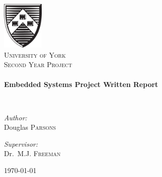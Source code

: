 \begin{titlepage}
\begin{center}

\includegraphics[width=0.15\textwidth]{./logo}~\\[1cm]

\textsc{\LARGE University of York}\\[1.5cm]

\textsc{\Large Second Year Project}\\[0.5cm]

\HRule \\[0.4cm]
{ \huge \bfseries Embedded Systems Project Written Report \\[0.4cm] }

\HRule \\[1.5cm]

\noindent
\begin{minipage}[t]{0.4\textwidth}
\begin{flushleft} \large
\emph{Author:}\\
Douglas \textsc{Parsons}
\end{flushleft}
\end{minipage}
\begin{minipage}[t]{0.4\textwidth}
\begin{flushright} \large
\emph{Supervisor:} \\
Dr.~M.J. \textsc{Freeman}
\end{flushright}
\end{minipage}

\vfill

{\large \today}

\end{center}
\end{titlepage}
